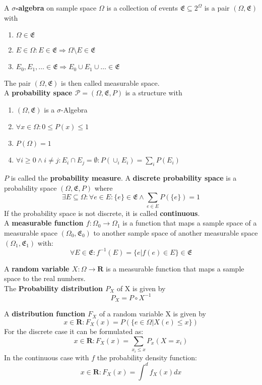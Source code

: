 A \textbf{$\sigma$-algebra} on sample space $\Omega$ is a collection of events $\mathfrak{E} \subseteq 2^{\Omega}$ is a pair $(\Omega, \mathfrak{E})$ with
\begin{enumerate}
    \item $\Omega \in \mathfrak{E}$
    \item $E \in \Omega: E \in \mathfrak{E} \Rightarrow \Omega \setminus E \in \mathfrak{E}$
    \item $E_0, E_1, \dots \in \mathfrak{E} \Rightarrow E_0 \cup E_1 \cup \dots \in \mathfrak{E}$
\end{enumerate}
The pair $(\Omega, \mathfrak{E})$ is then called measurable space. \\

A \textbf{probability space $\mathcal{P} = (\Omega, \mathfrak{E}, P)$} is a structure with
\begin{enumerate}
    \item $(\Omega, \mathfrak{E})$ is a $\sigma$-Algebra
    \item $\forall x \in \Omega: 0 \leq P(x) \leq 1$
    \item $P(\Omega) = 1$
    \item $\forall i \geq 0 \wedge i \neq j: E_i \cap E_j = \emptyset: P(\cup_i E_i) = \sum_i P(E_i)$ 
\end{enumerate}
$P$ is called the \textbf{probability measure}.
\vspace{0.5cm}
A \textbf{discrete probability space} is a probability space $(\Omega, \mathfrak{E}, P)$ where 
\[ \exists E \subseteq \Omega: \forall e \in E: \{e\} \in \mathfrak{E} \wedge \sum_{e \in E} P(\{e\}) = 1\]
If the probability space is not discrete, it is called \textbf{continuous}. \\

A \textbf{measurable function $f:\Omega_0 \rightarrow \Omega_1$} is a function that maps a sample space of a measurable space $(\Omega_0, \mathfrak{E}_0)$ to another sample space of another measurable space $(\Omega_1, \mathfrak{E}_1)$ with:
\[ \forall E \in \mathfrak{E}: f^{-1}(E) = \{ e | f(e) \in E \} \in \mathfrak{E} \]

A \textbf{random variable $X: \Omega \rightarrow \mathbf{R}$} is a measurable function that maps a sample space to the real numbers. \\
The \textbf{Probability distribution $P_X$} of X is given by \[ P_X = P \circ X^{-1} \]

A \textbf{distribution function $F_X$} of a random variable X is given by \[ x \in \mathbf{R}: F_X(x) = P(\{e \in \Omega | X(e) \leq x\}) \]
For the discrete case it can be formulated as: \[ x \in \mathbf{R}: F_X(x) = \sum_{x_i \leq x} P_x (X = x_i) \]
In the continuous case with $f$ the probability density function: \[ x \in \mathbf{R}: F_X(x) = \int^d f_X(x) dx \]


